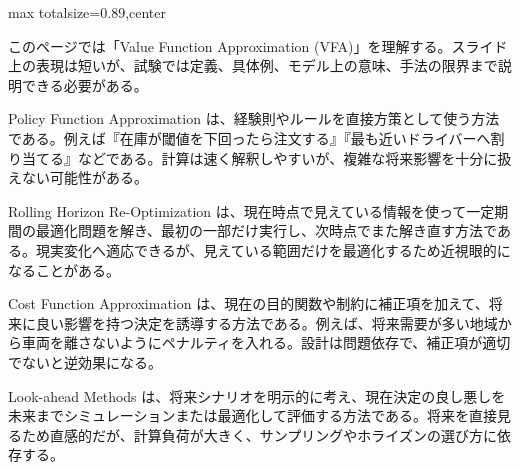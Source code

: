 \begin{minipage}[t]{0.58\textwidth}
\begin{adjustbox}{max totalsize={\textwidth}{0.89\textheight},center}
\begin{minipage}{\textwidth}\scriptsize
{}このページでは「Value Function Approximation (VFA)」を理解する。スライド上の表現は短いが、試験では定義、具体例、モデル上の意味、手法の限界まで説明できる必要がある。\par
Policy Function Approximation は、経験則やルールを直接方策として使う方法である。例えば『在庫が閾値を下回ったら注文する』『最も近いドライバーへ割り当てる』などである。計算は速く解釈しやすいが、複雑な将来影響を十分に扱えない可能性がある。\par
Rolling Horizon Re-Optimization は、現在時点で見えている情報を使って一定期間の最適化問題を解き、最初の一部だけ実行し、次時点でまた解き直す方法である。現実変化へ適応できるが、見えている範囲だけを最適化するため近視眼的になることがある。\par
Cost Function Approximation は、現在の目的関数や制約に補正項を加えて、将来に良い影響を持つ決定を誘導する方法である。例えば、将来需要が多い地域から車両を離さないようにペナルティを入れる。設計は問題依存で、補正項が適切でないと逆効果になる。\par
Look-ahead Methods は、将来シナリオを明示的に考え、現在決定の良し悪しを未来までシミュレーションまたは最適化して評価する方法である。将来を直接見るため直感的だが、計算負荷が大きく、サンプリングやホライズンの選び方に依存する。\par

\end{minipage}
\end{adjustbox}
\end{minipage}
